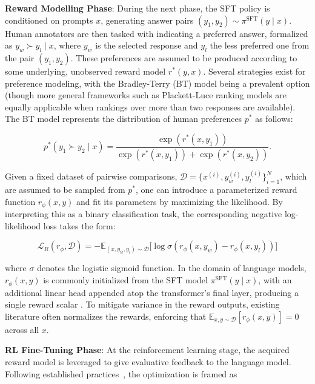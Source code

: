 \textbf{Reward Modelling Phase}: During the next phase, the SFT policy is conditioned on prompts $x$, generating answer pairs $(y_1, y_2)\sim \pi^\text{SFT}(y \mid x)$. Human annotators are then tasked with indicating a preferred answer, formalized as $y_w\succ y_l \mid x$, where $y_w$ is the selected response and $y_l$ the less preferred one from the pair $(y_1, y_2)$. These preferences are assumed to be produced according to some underlying, unobserved reward model $r^*(y, x)$. Several strategies exist for preference modeling, with the Bradley-Terry (BT) model \cite{bradley1952rankanalysis} being a prevalent option (though more general frameworks such as Plackett-Luce ranking models \citep{plackett1975analysis, luce2012individual} are equally applicable when rankings over more than two responses are available). The BT model represents the distribution of human preferences $p^*$ as follows:

\begin{equation}\label{eq:bradley-terry}
    p^*(y_1\succ y_2 \mid x)=\frac{\exp\left(r^*(x, y_1)\right)}{\exp\left(r^*(x, y_1)\right) + \exp\left(r^*(x, y_2)\right)}.
\end{equation}

Given a fixed dataset of pairwise comparisons, $\mathcal{D}=\bigl\{x^{(i)}, y_w^{(i)}, y_l^{(i)}\bigr\}_{i=1}^N$, which are assumed to be sampled from $p^*$, one can introduce a parameterized reward function $r_{\phi}(x, y)$ and fit its parameters by maximizing the likelihood. By interpreting this as a binary classification task, the corresponding negative log-likelihood loss takes the form:

\begin{equation}\label{eq:reward_model}
    \mathcal{L}_R(r_{\phi}, \mathcal{D}) = -\mathbb{E}_{(x, y_w, y_l)\sim \mathcal{D}}\bigl[\log \sigma(r_{\phi}(x, y_w)- r_{\phi}(x, y_l))\bigr]
\end{equation}

where $\sigma$ denotes the logistic sigmoid function. In the domain of language models, $r_{\phi}(x, y)$ is commonly initialized from the SFT model $\pi^\text{SFT}(y \mid x)$, with an additional linear head appended atop the transformer's final layer, producing a single reward scalar \cite{ziegler2020finetuning}. To mitigate variance in the reward outputs, existing literature often normalizes the rewards, enforcing that $\mathbb{E}_{x,y\sim \mathcal{D}}\left[r_\phi(x, y)\right] = 0$ across all $x$.

\textbf{RL Fine-Tuning Phase}: At the reinforcement learning stage, the acquired reward model is leveraged to give evaluative feedback to the language model. Following established practices~\citep{jaques2017sequence, jaques2020human}, the optimization is framed as

